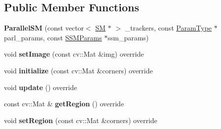 \subsection*{Public Member Functions}
\begin{DoxyCompactItemize}
\item 
\hypertarget{classParallelSM_a5bdf4c3754bd83528a4ede0648100cf3}{{\bfseries Parallel\-S\-M} (const vector$<$ \hyperlink{classSearchMethod}{S\-M} $\ast$ $>$ \-\_\-trackers, const \hyperlink{structParallelParams}{Param\-Type} $\ast$parl\-\_\-params, const \hyperlink{structSSMParams}{S\-S\-M\-Params} $\ast$ssm\-\_\-params)}\label{classParallelSM_a5bdf4c3754bd83528a4ede0648100cf3}

\item 
\hypertarget{classParallelSM_a3c35411d6914c92f8b11e1cd07cfed6d}{void {\bfseries set\-Image} (const cv\-::\-Mat \&img) override}\label{classParallelSM_a3c35411d6914c92f8b11e1cd07cfed6d}

\item 
\hypertarget{classParallelSM_aea9cdb92bea96c013dab747859780de1}{void {\bfseries initialize} (const cv\-::\-Mat \&corners) override}\label{classParallelSM_aea9cdb92bea96c013dab747859780de1}

\item 
\hypertarget{classParallelSM_ae026e76bc9e68091fd4ace3b34d96b1e}{void {\bfseries update} () override}\label{classParallelSM_ae026e76bc9e68091fd4ace3b34d96b1e}

\item 
\hypertarget{classParallelSM_a221f9ac6ca30422cb04787ac50a0616d}{const cv\-::\-Mat \& {\bfseries get\-Region} () override}\label{classParallelSM_a221f9ac6ca30422cb04787ac50a0616d}

\item 
\hypertarget{classParallelSM_ace107afbb700495b0b1ea85532fbd309}{void {\bfseries set\-Region} (const cv\-::\-Mat \&corners) override}\label{classParallelSM_ace107afbb700495b0b1ea85532fbd309}

\end{DoxyCompactItemize}
